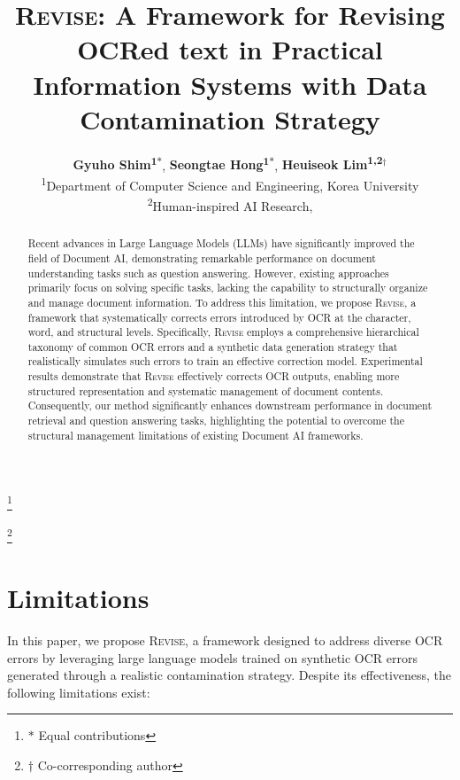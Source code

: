\documentclass[11pt]{article}
\title{\textsc{Revise}: A Framework for Revising OCRed text in Practical Information Systems with Data Contamination Strategy}
\author{
 \textbf{Gyuho Shim\textsuperscript{1$\ast$}},
 \textbf{Seongtae Hong\textsuperscript{1$\ast$}},
 \textbf{Heuiseok Lim\textsuperscript{1,2}$^{\dagger}$}
\\
 \textsuperscript{1}Department of Computer Science and Engineering, Korea University\\
 \textsuperscript{2}Human-inspired AI Research,
\\
\text{\{gjshim, ghdchlwls123, limhseok\}@korea.ac.kr}}
\newcommand\blfootnote[1]{%
  \begingroup
  \renewcommand\thefootnote{}\footnote{#1}%
  \addtocounter{footnote}{-1}%
  \endgroup
}
\begin{document}
\maketitle
\begin{abstract}
Recent advances in Large Language Models (LLMs) have significantly improved the field of Document AI, demonstrating remarkable performance on document understanding tasks such as question answering. However, existing approaches primarily focus on solving specific tasks, lacking the capability to structurally organize and manage document information. To address this limitation, we propose \textsc{Revise}, a framework that systematically corrects errors introduced by OCR at the character, word, and structural levels. Specifically, \textsc{Revise} employs a comprehensive hierarchical taxonomy of common OCR errors and a synthetic data generation strategy that realistically simulates such errors to train an effective correction model. Experimental results demonstrate that \textsc{Revise} effectively corrects OCR outputs, enabling more structured representation and systematic management of document contents. Consequently, our method significantly enhances downstream performance in document retrieval and question answering tasks, highlighting the potential to overcome the structural management limitations of existing Document AI frameworks.



\end{abstract}
\blfootnote{$\ast$ Equal contributions}
\blfootnote{$\dagger$ Co-corresponding author}










\section*{Limitations}
In this paper, we propose \textsc{Revise}, a framework designed to address diverse OCR errors  by leveraging large language models trained on synthetic OCR errors generated through a realistic contamination strategy. Despite its effectiveness, the following limitations exist:
\end{document}
